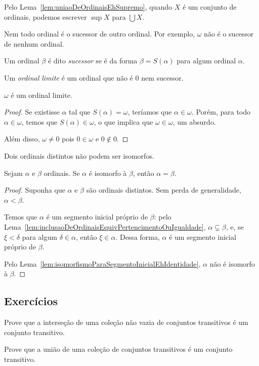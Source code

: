 Pelo Lema~\ref{lem:uniaoDeOrdinaisEhSupremo}, quando $X$ é um conjunto de ordinais, podemos escrever $\sup X$ para $\bigcup X$.

Nem todo ordinal é o sucessor de outro ordinal.
Por exemplo, $\omega$ não é o sucessor de nenhum ordinal.

\begin{definition}[$\BST$]\label{def:ordinaisSucessoresELimites}
    Um ordinal $\beta$ é dito \emph{sucessor} se é da forma $\beta=S(\alpha)$ para algum ordinal $\alpha$.

    Um \emph{ordinal limite} é um ordinal que não é $0$ nem sucessor.
\end{definition}

\begin{proposition}[$\BSTI$]\label{prop:omegaEhOrdinalLimite}
    $\omega$ é um ordinal limite.
\end{proposition}
\begin{proof}
Se existisse $\alpha$ tal que $S(\alpha)=\omega$, teríamos que $\alpha\in \omega$.
Porém, para todo $\alpha \in \omega$, temos que $S(\alpha)\in \omega$, o que implica que $\omega\in \omega$, um absurdo.

Além disso, $\omega\neq 0$ pois $0 \in \omega$ e $0\notin 0$.
\end{proof}

Dois ordinais distintos não podem ser isomorfos.

\begin{proposition}[$\BST$]\label{prop:ordinaisNaoSaoIsomorfos}
    Sejam $\alpha$ e $\beta$ ordinais.
    Se $\alpha$ é isomorfo à $\beta$, então $\alpha=\beta$.
\end{proposition}
\begin{proof}
    Suponha que $\alpha$ e $\beta$ são ordinais distintos.
    Sem perda de generalidade, $\alpha<\beta$.

    Temos que $\alpha$ é um segmento inicial próprio de $\beta$: pelo Lema~\ref{lem:inclusaoDeOrdinaisEquivPertencimentoOuIgualdade}, $\alpha\subsetneq \beta$, e, se $\xi<\delta$ para algum $\delta\in \alpha$, então $\xi\in \alpha$.
    Dessa forma, $\alpha$ é um segmento inicial próprio de $\beta$.

    Pelo Lema~\ref{lem:isomorfismoParaSegmentoInicialEhIdentidade}, $\alpha$ não é isomorfo à $\beta$.
\end{proof}
\subsection*{Exercícios}
\begin{exercise}[$\BST$]
    Prove que a interseção de uma coleção não vazia de conjuntos transitivos é um conjunto transitivo.
\end{exercise}
\begin{exercise}[$\BST$]
    Prove que a união de uma coleção de conjuntos transitivos é um conjunto transitivo.
\end{exercise}

